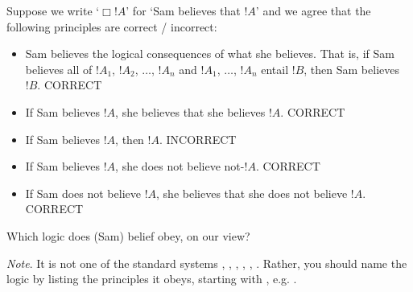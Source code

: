 \documentclass[../../../../include/open-logic-section]{subfiles}
\begin{document}


\begin{prob}
Suppose we write `$\Box !A$' for `Sam believes that $ !A$' and
we agree that the following principles are correct / incorrect:

\begin{itemize}
\item Sam believes the logical consequences of what she believes. That is,
if Sam believes all of $ !A_{1}$, $ !A_{2}$, $\ldots$, $ !A_{n}$
and $ !A_{1}$, $\ldots$, $ !A_{n}$ entail $!B$, then Sam believes
$!B$. CORRECT
\item If Sam believes $!A$, she believes that she believes $!A$. CORRECT
\item If Sam believes $!A$, then $!A$. INCORRECT 
\item If Sam believes $!A$, she does not believe not-$!A$. CORRECT
\item If Sam does not believe $!A$, she believes that she does not believe
$ !A$. CORRECT
\end{itemize}
Which logic does (Sam) belief obey, on our view?

\emph{Note}. It is not one of the standard systems , ,
, , , . Rather,
you should name the logic by listing the principles it obeys,
starting with , e.g. .


\end{prob}
\end{document}
